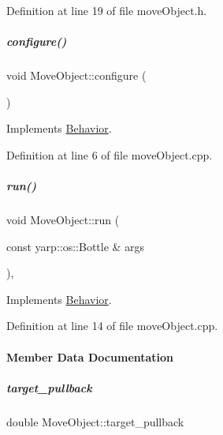 Definition at line 19 of file move\+Object.\+h.

\mbox{\label{group__behaviorManager_a5e068840a2d5f5fbeafc61b075f63804}} 
\subparagraph{\texorpdfstring{configure()}{configure()}}
{\footnotesize\ttfamily void Move\+Object\+::configure (\begin{DoxyParamCaption}{ }\end{DoxyParamCaption})\hspace{0.3cm}{\ttfamily [virtual]}}



Implements \hyperlink{group__behaviorManager_a30484d4d6de3c0689de4f60da3efbab8}{Behavior}.



Definition at line 6 of file move\+Object.\+cpp.

\mbox{\label{group__behaviorManager_a2e242410f34618b2ff73f9106732470b}} 
\subparagraph{\texorpdfstring{run()}{run()}}
{\footnotesize\ttfamily void Move\+Object\+::run (\begin{DoxyParamCaption}\item[{const yarp\+::os\+::\+Bottle \&}]{args }\end{DoxyParamCaption})\hspace{0.3cm}{\ttfamily [protected]}, {\ttfamily [virtual]}}



Implements \hyperlink{group__behaviorManager_a7dfd81b30f9ddf1864093626650751c3}{Behavior}.



Definition at line 14 of file move\+Object.\+cpp.



\paragraph{Member Data Documentation}
\mbox{\label{group__behaviorManager_af15f2e56d8d27f8534f3d34cc2ad48cd}} 
\subparagraph{\texorpdfstring{target\+\_\+pullback}{target\_pullback}}
{\footnotesize\ttfamily double Move\+Object\+::target\+\_\+pullback\hspace{0.3cm}{\ttfamily [protected]}}



